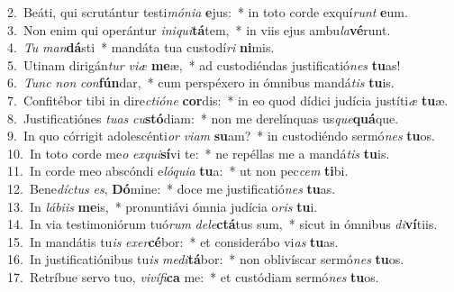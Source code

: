 {2.~}Beáti, qui scrutántur testi\textit{mó}\textit{ni}\textit{a} \textbf{e}jus:~* in toto corde exquí\textit{runt} \textbf{e}um.\\
{3.~}Non enim qui operántur \textit{i}\textit{ni}\textit{qui}\textbf{tá}tem,~* in viis ejus ambu\textit{la}\textbf{vé}runt.\\
{4.~}\textit{Tu} \textit{man}\textbf{dá}sti~* mandáta tua custodí\textit{ri} \textbf{ni}mis.\\
{5.~}Utinam dirigán\textit{tur} \textit{vi}\textit{æ} \textbf{me}æ,~* ad custodiéndas justificatió\textit{nes} \textbf{tu}as!\\
{6.~}\textit{Tunc} \textit{non} \textit{con}\textbf{fún}dar,~* cum perspéxero in ómnibus mandá\textit{tis} \textbf{tu}is.\\
{7.~}Confitébor tibi in dire\textit{cti}\textit{ó}\textit{ne} \textbf{cor}dis:~* in eo quod dídici judícia justíti\textit{æ} \textbf{tu}æ.\\
{8.~}Justificatiónes \textit{tu}\textit{as} \textit{cu}\textbf{stó}diam:~* non me derelínquas us\textit{que}\textbf{quá}que.\\
{9.~}In quo córrigit adolescénti\textit{or} \textit{vi}\textit{am} \textbf{su}am?~* in custodiéndo sermó\textit{nes} \textbf{tu}os.\\
{10.~}In toto corde me\textit{o} \textit{ex}\textit{qui}\textbf{sí}vi te:~* ne repéllas me a mandá\textit{tis} \textbf{tu}is.\\
{11.~}In corde meo abscóndi e\textit{ló}\textit{qui}\textit{a} \textbf{tu}a:~* ut non pec\textit{cem} \textbf{ti}bi.\\
{12.~}Bene\textit{dí}\textit{ctus} \textit{es}, \textbf{Dó}mine:~* doce me justificatió\textit{nes} \textbf{tu}as.\\
{13.~}In \textit{lá}\textit{bi}\textit{is} \textbf{me}is,~* pronuntiávi ómnia judícia o\textit{ris} \textbf{tu}i.\\
{14.~}In via testimoniórum tuó\textit{rum} \textit{de}\textit{le}\textbf{ctá}tus sum,~* sicut in ómnibus \textit{di}\textbf{ví}tiis.\\
{15.~}In mandátis tu\textit{is} \textit{e}\textit{xer}\textbf{cé}bor:~* et considerábo vi\textit{as} \textbf{tu}as.\\
{16.~}In justificatiónibus tu\textit{is} \textit{me}\textit{di}\textbf{tá}bor:~* non oblivíscar sermó\textit{nes} \textbf{tu}os.\\
{17.~}Retríbue servo tuo, \textit{vi}\textit{ví}\textit{fi}\textbf{ca} me:~* et custódiam sermó\textit{nes} \textbf{tu}os.\\
